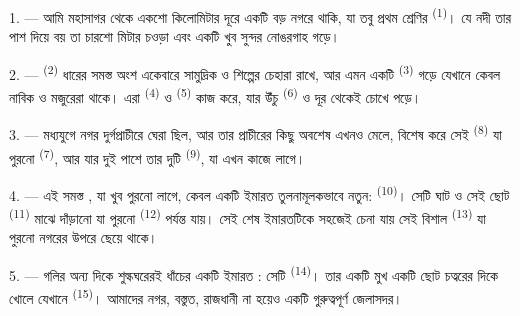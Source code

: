 %

\VUsaut{2.0mm}
\VUsaut{3.0mm}
\VUfilet{16mm}
\VUsaut{5.6mm}
\VUsaut{1.4mm}
\VUsaut{2.2mm}

\VUsaut{3.0mm}

1. --- আমি মহাসাগর থেকে একশো কিলোমিটার দূরে একটি বড় নগরে থাকি, যা তবু
প্রথম শ্রেণির  \textsuperscript{(1)}। যে নদী তার পাশ দিয়ে বয় তা
চারশো মিটার চওড়া এবং একটি খুব সুন্দর নোঙরগাহ গড়ে।

2. ---  \textsuperscript{(2)} ধারের সমস্ত অংশ একেবারে সামুদ্রিক ও
শিল্পের চেহারা রাখে, আর এমন একটি  \textsuperscript{(3)}
গড়ে যেখানে কেবল নাবিক ও মজুরেরা থাকে। এরা 
\textsuperscript{(4)} ও  \textsuperscript{(5)} কাজ করে, যার উঁচু
 \textsuperscript{(6)} ও  দূর থেকেই চোখে পড়ে।

3. --- মধ্যযুগে নগর দুর্গপ্রাচীরে ঘেরা ছিল, আর তার প্রাচীরের কিছু অবশেষ এখনও
মেলে, বিশেষ করে সেই  \textsuperscript{(8)} যা পুরনো 
\textsuperscript{(7)}, আর যার দুই পাশে তার দুটি  \textsuperscript{(9)},
যা এখন  কাজে লাগে।

4. --- এই সমস্ত , যা খুব পুরনো লাগে, কেবল একটি ইমারত
তুলনামূলকভাবে নতুন:  \textsuperscript{(10)}। সেটি ঘাট ও সেই ছোট
 \textsuperscript{(11)} মাঝে দাঁড়ানো যা পুরনো 
\textsuperscript{(12)} পর্যন্ত যায়। সেই শেষ ইমারতটিকে সহজেই চেনা যায় সেই বিশাল
 \textsuperscript{(13)} যা পুরনো নগরের উপরে ছেয়ে থাকে।

5. --- গলির অন্য দিকে শুল্কঘরেরই ধাঁচের একটি ইমারত : সেটি
 \textsuperscript{(14)}। তার একটি মুখ একটি ছোট চত্বরের দিকে
খোলে যেখানে  \textsuperscript{(15)}। আমাদের নগর, বস্তুত,
রাজধানী না হয়েও একটি গুরুত্বপূর্ণ জেলাসদর।

